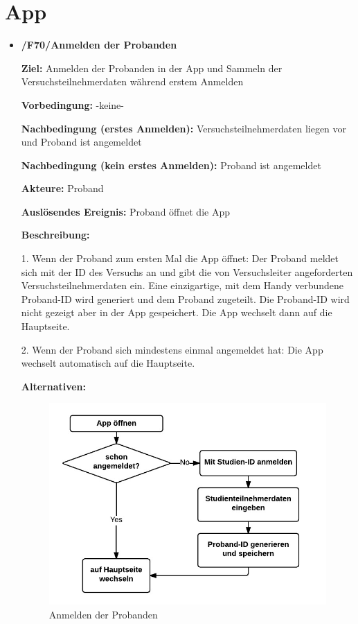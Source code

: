 \documentclass[a4paper]{scrreprt}
\begin{document}
    \newpage
    \section{App}

        \begin{itemize}
            \item \textbf{/F70/Anmelden der Probanden}

				\par \textbf{Ziel: }Anmelden der Probanden in der App und Sammeln der Versuchsteilnehmerdaten während erstem Anmelden
				\par \textbf{Vorbedingung: }-keine-
				\par \textbf{Nachbedingung (erstes Anmelden): }Versuchsteilnehmerdaten liegen vor und Proband ist angemeldet
				\par \textbf{Nachbedingung (kein erstes Anmelden): }Proband ist angemeldet
				\par \textbf{Akteure: }Proband
				\par \textbf{Auslösendes Ereignis: }Proband öffnet die App
				\par \textbf{Beschreibung: }
				\par 1. Wenn der Proband zum ersten Mal die App öffnet: Der Proband meldet sich mit der ID des Versuchs an und gibt die
				 von Versuchsleiter angeforderten Versuchsteilnehmerdaten ein. Eine einzigartige, mit dem Handy verbundene Proband-ID wird generiert und dem Proband zugeteilt. Die Proband-ID wird nicht gezeigt aber in der App gespeichert. Die App wechselt dann auf die Hauptseite.
				\par 2. Wenn der Proband sich mindestens einmal angemeldet hat: Die App wechselt automatisch auf die Hauptseite.
				\par \textbf{Alternativen: }
				\begin{figure}[ht]
					\centering
					\includegraphics[scale=1]{AppAnmelden.jpeg}
					\caption{Anmelden der Probanden}
				\end{figure}
								


\end{itemize}
\end{document}
